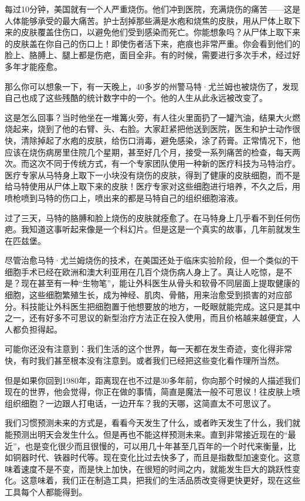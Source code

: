 每过10分钟，美国就有一个人严重烧伤。他们冲到医院，充满烧伤的痛苦——这是人体能够承受的最大痛苦。护士刮掉那些满是水疱和烧焦的皮肤，用从尸体上取下来的皮肤覆盖住伤口，以避免他们受到感染而死亡。你能想象吗？从尸体上取下来的皮肤盖在你自己的伤口上！即使伤者活下来，疤痕也非常严重。你会看到他们的脸上、胳膊上、腿上都是伤疤，面目全非。有的时候，需要进行多次手术，经过好多年才能痊愈。

那么你可以想象一下，有一天晚上，40多岁的州警马特·尤兰姆也被烧伤了，发现自己也成了这些残酷的统计数字中的一个。他的人生从此永远被改变了。

这是怎么回事？当时他坐在一堆篝火旁，有人往火里面扔了一罐汽油，结果大火燃烧起来，烧到了他的右臂、头、右脸。大家赶紧把他送到医院，医生和护士动作很快，清除掉起了水疱的皮肤，给伤口消毒，避免感染，涂了药膏。正常情况下，他应该在烧伤病房里住院几个星期，甚至好几个月，接受一系列痛苦的检查，每天两次。而这次不同于传统方式，有一个专家团队使用一种新的医疗科技为马特治疗。医疗专家从马特身上取下一小块没有烧伤的皮肤，得到了健康的皮肤细胞，而不是给马特使用从尸体上取下来的皮肤！医疗专家对这些细胞进行培养，不久之后，用喷枪喷到马特的伤口上，喷出来的都是马特自己的组织细胞溶液。

过了三天，马特的胳膊和脸上烧伤的皮肤就痊愈了。在马特身上几乎看不到任何伤疤。我知道这事听起来像是一个科幻片。但是这是一个真实的故事，几年前就发生在匹兹堡。

尽管治愈马特·尤兰姆烧伤的技术，在美国还处于临床实验阶段，但一个类似的干细胞手术已经在欧洲和澳大利亚用在几百个烧伤病人身上了。真让人吃惊，是不是？现在甚至有一种“生物笔”，能让外科医生从骨头和软骨不同层面上提取健康的细胞，这些细胞繁殖生长，成为神经、肌肉、骨骼，用来治愈受到损害的对应部分。科技能让外科医生把细胞置于他想要放的地方，一眨眼就能完成。这只是其中之一，还有好多不可思议的新型治疗方法正在投入使用，而且价格越来越便宜，人人都负担得起。

可能你还没有注意到：我们生活的这个世界，每一天都在发生奇迹，变化得非常快，有时我们甚至根本没有注意到。或者我们已经把这些变化看作理所当然。

但是如果你回到1980年，距离现在也不过是30多年前，你向那个时候的人描述我们现在的世界，他会觉得，你正在做的事情，简直是魔法一般不可思议！往皮肤上喷组织细胞？一边跟人打电话，一边开车？我的天哪，这简直太不可思议了。

我们习惯预测未来的方式是，看看今天发生了什么，或者昨天发生了什么，我们就能预测出明天会发生什么。但是再也不能这样预测未来。直到非常接近现在的“最近”，也是变化很少而且很慢的，可以用几十年甚至几百年的一个时代来衡量，比如铜器时代、铁器时代等。现在变化比过去快多了，而且是指数型加速变化。这意味着速度不是不变，而是快上加快，在很短的时间之内，就能发生巨大的跳跃性变化。这意味着，我们正在制造工具，把我们的生活品质改变得更快更好，现在这些工具每个人都能得到。

